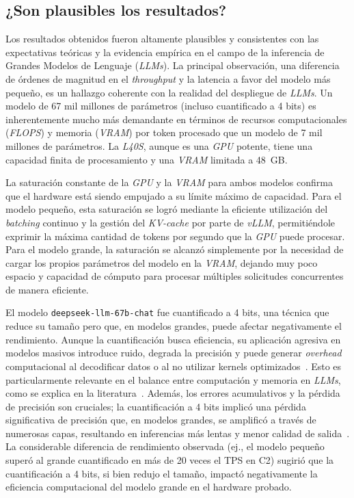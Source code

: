 \subsection*{¿Son plausibles los resultados?}
Los resultados obtenidos fueron altamente plausibles y consistentes con las expectativas teóricas y la evidencia empírica en el campo de la inferencia de Grandes Modelos de Lenguaje (\textit{LLMs}). La principal observación, una diferencia de órdenes de magnitud en el \textit{throughput} y la latencia a favor del modelo más pequeño, es un hallazgo coherente con la realidad del despliegue de \textit{LLMs}. Un modelo de 67 mil millones de parámetros (incluso cuantificado a 4 bits) es inherentemente mucho más demandante en términos de recursos computacionales (\textit{FLOPS}) y memoria (\textit{VRAM}) por token procesado que un modelo de 7 mil millones de parámetros. La \textit{L40S}, aunque es una \textit{GPU} potente, tiene una capacidad finita de procesamiento y una \textit{VRAM} limitada a 48~GB.

La saturación constante de la \textit{GPU} y la \textit{VRAM} para ambos modelos confirma que el hardware está siendo empujado a su límite máximo de capacidad. Para el modelo pequeño, esta saturación se logró mediante la eficiente utilización del \textit{batching} continuo y la gestión del \textit{KV-cache} por parte de \textit{vLLM}, permitiéndole exprimir la máxima cantidad de tokens por segundo que la \textit{GPU} puede procesar. Para el modelo grande, la saturación se alcanzó simplemente por la necesidad de cargar los propios parámetros del modelo en la \textit{VRAM}, dejando muy poco espacio y capacidad de cómputo para procesar múltiples solicitudes concurrentes de manera eficiente.

El modelo \texttt{deepseek-llm-67b-chat} fue cuantificado a 4 bits, una técnica que reduce su tamaño pero que, en modelos grandes, puede afectar negativamente el rendimiento. Aunque la cuantificación busca eficiencia, su aplicación agresiva en modelos masivos introduce ruido, degrada la precisión y puede generar \textit{overhead} computacional al decodificar datos o al no utilizar kernels optimizados~\cite{ref31}. Esto es particularmente relevante en el balance entre computación y memoria en \textit{LLMs}, como se explica en la literatura~\cite{ref30}. Además, los errores acumulativos y la pérdida de precisión son cruciales; la cuantificación a 4 bits implicó una pérdida significativa de precisión que, en modelos grandes, se amplificó a través de numerosas capas, resultando en inferencias más lentas y menor calidad de salida~\cite{32}. La considerable diferencia de rendimiento observada (ej., el modelo pequeño superó al grande cuantificado en más de 20 veces el TPS en C2) sugirió que la cuantificación a 4 bits, si bien redujo el tamaño, impactó negativamente la eficiencia computacional del modelo grande en el hardware probado.

